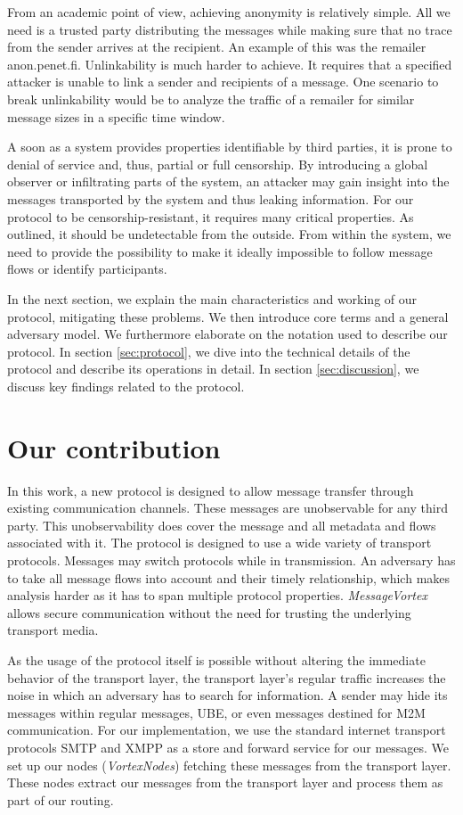 \documentclass[acmsmall, screen, review]{acmart}
\begin{document}
From an academic point of view, achieving anonymity is relatively simple. All we need is a trusted party distributing the messages while making sure that no trace from the sender arrives at the recipient. An example of this was the remailer anon.penet.fi. Unlinkability is much harder to achieve. It requires that a specified attacker is unable to link a sender and recipients of a message. One scenario to break unlinkability would be to analyze the traffic of a remailer for similar message sizes in a specific time window.

A soon as a system provides properties identifiable by third parties, it is prone to denial of service and, thus, partial or full censorship. By introducing a global observer or infiltrating parts of the system, an attacker may gain insight into the messages transported by the system and thus leaking information. For our protocol to be censorship-resistant, it requires many critical properties. As outlined, it should be undetectable from the outside. From within the system, we need to provide the possibility to make it ideally impossible to follow message flows or identify participants.

In the next section, we explain the main characteristics and working of our protocol, mitigating these problems. We then introduce core terms and a general adversary model. We furthermore elaborate on the notation used to describe our protocol. In section \ref{sec:protocol}, we dive into the technical details of the protocol and describe its operations in detail. In section \ref{sec:discussion}, we discuss key findings related to the protocol.

\section{Our contribution}
In this work, a new protocol is designed to allow message transfer through existing communication channels. These messages are unobservable for any third party. This unobservability does cover the message and all metadata and flows associated with it.  The protocol is designed to use a wide variety of transport protocols. Messages may switch protocols while in transmission. An adversary has to take all message flows into account and their timely relationship, which makes analysis harder as it has to span multiple protocol properties. \emph{MessageVortex} allows secure communication without the need for trusting the underlying transport media.

As the usage of the protocol itself is possible without altering the immediate behavior of the transport layer, the transport layer's regular traffic increases the noise in which an adversary has to search for information. A sender may hide its messages within regular messages, UBE, or even messages destined for M2M communication. For our implementation, we use the standard internet transport protocols SMTP and XMPP as a store and forward service for our messages. We set up our nodes (\emph{VortexNodes}) fetching these messages from the transport layer. These nodes extract our messages from the transport layer and process them as part of our routing. 
\end{document}
